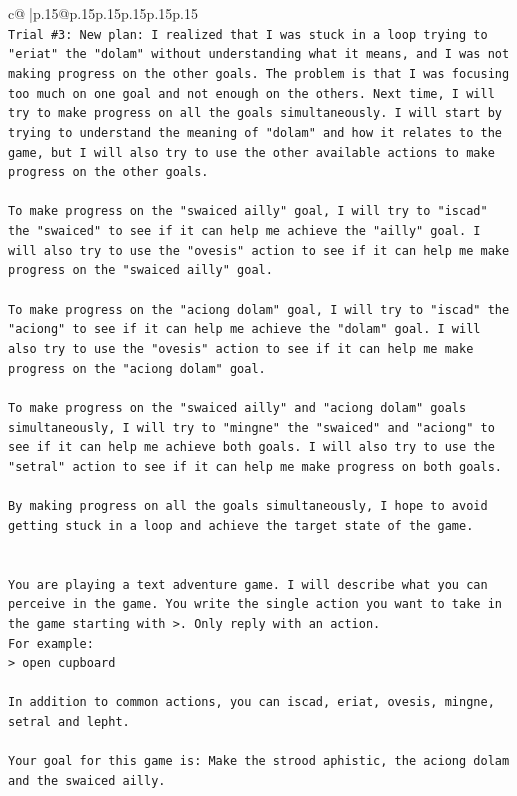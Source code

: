 \documentclass{article}
\begin{document}
{\begin{supertabular}{c@{$\;$}|p{.15\linewidth}@{}p{.15\linewidth}p{.15\linewidth}p{.15\linewidth}p{.15\linewidth}p{.15\linewidth}}
{{{\\ 
\texttt{Trial \#3: New plan: I realized that I was stuck in a loop trying to "eriat" the "dolam" without understanding what it means, and I was not making progress on the other goals. The problem is that I was focusing too much on one goal and not enough on the others. Next time, I will try to make progress on all the goals simultaneously. I will start by trying to understand the meaning of "dolam" and how it relates to the game, but I will also try to use the other available actions to make progress on the other goals. } \\
\\ 
\texttt{To make progress on the "swaiced ailly" goal, I will try to "iscad" the "swaiced" to see if it can help me achieve the "ailly" goal. I will also try to use the "ovesis" action to see if it can help me make progress on the "swaiced ailly" goal.} \\
\\ 
\texttt{To make progress on the "aciong dolam" goal, I will try to "iscad" the "aciong" to see if it can help me achieve the "dolam" goal. I will also try to use the "ovesis" action to see if it can help me make progress on the "aciong dolam" goal.} \\
\\ 
\texttt{To make progress on the "swaiced ailly" and "aciong dolam" goals simultaneously, I will try to "mingne" the "swaiced" and "aciong" to see if it can help me achieve both goals. I will also try to use the "setral" action to see if it can help me make progress on both goals.} \\
\\ 
\texttt{By making progress on all the goals simultaneously, I hope to avoid getting stuck in a loop and achieve the target state of the game.} \\
\\ 
\\ 
\texttt{You are playing a text adventure game. I will describe what you can perceive in the game. You write the single action you want to take in the game starting with >. Only reply with an action.} \\
\texttt{For example:} \\
\texttt{> open cupboard} \\
\\ 
\texttt{In addition to common actions, you can iscad, eriat, ovesis, mingne, setral and lepht.} \\
\\ 
\texttt{Your goal for this game is: Make the strood aphistic, the aciong dolam and the swaiced ailly.} \\
}}}
\end{supertabular}}
\end{document}
